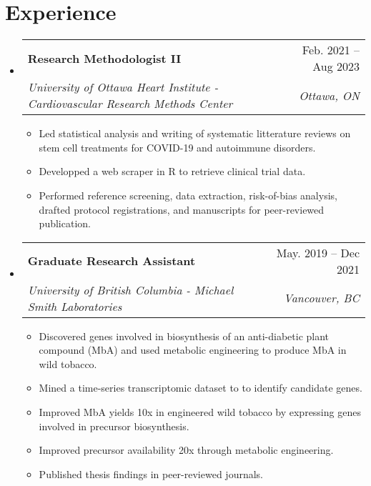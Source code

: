 \documentclass[letterpaper,11pt]{article}
\makeatletter
\newcommand{\resumeItem}[1]{
  \item\small{
    {#1 \vspace{-2pt}}
  }
}
\newcommand{\resumeSubheading}[4]{
  \vspace{-2pt}\item
    \begin{tabular*}{0.97\textwidth}[t]{l@{\extracolsep{\fill}}r}
      \textbf{#1} & #2 \\
      \textit{\small#3} & \textit{\small #4} \\
    \end{tabular*}\vspace{-7pt}
}
\newcommand{\resumeSubSubheading}[2]{
    \item
    \begin{tabular*}{0.97\textwidth}{l@{\extracolsep{\fill}}r}
      \textit{\small#1} & \textit{\small #2} \\
    \end{tabular*}\vspace{-7pt}
}
\newcommand{\resumeSubHeadingListStart}{\begin{itemize}[leftmargin=0.15in, label={}]}
\newcommand{\resumeSubHeadingListEnd}{\end{itemize}}
\newcommand{\resumeItemListStart}{\begin{itemize}}
\newcommand{\resumeItemListEnd}{\end{itemize}\vspace{-5pt}}
\makeatother
\begin{document}
\section{Experience}
  \resumeSubHeadingListStart
  
    \resumeSubheading
      {Research Methodologist II}{Feb. 2021 -- Aug 2023}
      {University of Ottawa Heart Institute - Cardiovascular Research Methods Center}{Ottawa, ON}
      \resumeItemListStart
        \resumeItem{Led statistical analysis and writing of systematic litterature reviews on stem cell treatments for COVID-19 and autoimmune disorders.}
        \resumeItem{Developped a web scraper in R to retrieve clinical trial data.}
        \resumeItem{Performed reference screening, data extraction, risk-of-bias analysis, drafted protocol registrations, and manuscripts for peer-reviewed publication.}
    \resumeItemListEnd
    
    \resumeSubheading
      {Graduate Research Assistant}{May. 2019 -- Dec 2021}
      {University of British Columbia - Michael Smith Laboratories }{Vancouver, BC}
      \resumeItemListStart
        \resumeItem{Discovered genes involved in biosynthesis of an anti-diabetic plant compound (MbA) and used metabolic engineering to produce MbA in wild tobacco.}
        \resumeItem{Mined a time-series transcriptomic dataset to to identify candidate genes.}
        \resumeItem{Improved MbA yields 10x in engineered wild tobacco by expressing genes involved in precursor biosynthesis.}
        \resumeItem{Improved precursor availability 20x through metabolic engineering.}
        \resumeItem{Published thesis findings in peer-reviewed journals.}
      \resumeItemListEnd
      



  \resumeSubHeadingListEnd

  
\end{document}
